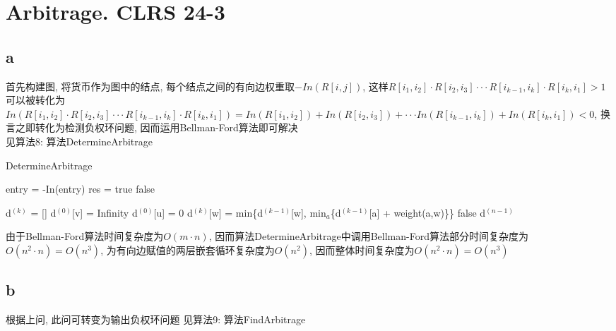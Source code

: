 \documentclass{article}
\begin{document}
\section{Arbitrage. CLRS 24-3}
\subsection{a}
首先构建图, 将货币作为图中的结点, 每个结点之间的有向边权重取$-In(R[i,j])$, 这样$R[i_1,i_2] \cdot R[i_2,i_3] \cdot \cdot \cdot R[i_{k-1},i_k] \cdot R[i_k, i_1]>1$可以被转化为$In(R[i_1,i_2] \cdot R[i_2,i_3] \cdot \cdot \cdot R[i_{k-1},i_k] \cdot R[i_k, i_1]) = In(R[i_1,i_2] )+In(R[i_2,i_3])+ \cdot \cdot \cdot In(R[i_{k-1},i_k])+In(R[i_k, i_1]) < 0$, 换言之即转化为检测负权环问题, 因而运用Bellman-Ford算法即可解决 \\
见算法8: 算法DetermineArbitrage

\begin{algorithm}
\caption{DetermineArbitrage}
\begin{algorithmic}[1]
\State entry = -In(entry)
\EndFor
\State res = 
\State \Return true
\EndIf
\State \Return false
\EndProcedure

\State d$^{(k)}$ = [] 
\EndFor
{}
\State d$^{(0)}$[v] = Infinity
\EndFor
\State d$^{(0)}$[u] = 0
\State d$^{(k)}$[w] = min\{d$^{(k-1)}$[w], min$_a$\{d$^{(k-1)}$[a] + weight(a,w)\}\}
\EndFor
\EndFor
{}
\State \Return false
\EndIf
\State \Return d$^{(n-1)}$
\EndProcedure
\end{algorithmic}
\end{algorithm}

由于Bellman-Ford算法时间复杂度为$O(m \cdot n)$, 因而算法DetermineArbitrage中调用Bellman-Ford算法部分时间复杂度为$O(n^2 \cdot n) = O(n^3)$, 为有向边赋值的两层嵌套循环复杂度为$O(n^2)$, 因而整体时间复杂度为$O(n^2 \cdot n) = O(n^3)$

\subsection{b}
根据上问, 此问可转变为输出负权环问题
见算法9: 算法FindArbitrage
\end{document}
